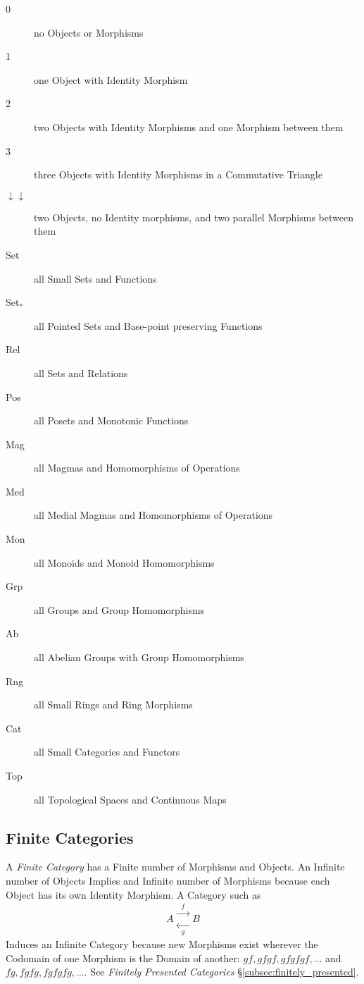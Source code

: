 \begin{description}
\item [0] no Objects or Morphisms
\item [1] one Object with Identity Morphism
\item [2] two Objects with Identity Morphisms and one Morphism between
  them
\item [3] three Objects with Identity Morphisms in a Commutative
  Triangle
\item [$\downarrow\downarrow$] two Objects, no Identity morphisms, and
  two parallel Morphisms between them
\item [Set] all Small Sets and Functions
\item [Set$_*$] all Pointed Sets and Base-point preserving Functions
\item [Rel] all Sets and Relations
\item [Pos] all Posets and Monotonic Functions
\item [Mag] all Magmas and Homomorphisms of Operations
\item [Med] all Medial Magmas and Homomorphisms of Operations
\item [Mon] all Monoids and Monoid Homomorphisms
\item [Grp] all Groups and Group Homomorphisms
\item [Ab] all Abelian Groups with Group Homomorphisms
\item [Rng] all Small Rings and Ring Morphisms
\item [Cat] all Small Categories and Functors
\item [Top] all Topological Spaces and Continuous Maps
\end{description}

\subsection{Finite Categories}\label{subsec:finite_categories}

A \emph{Finite Category} has a Finite number of Morphisms and
Objects. An Infinite number of Objects Implies and Infinite number of
Morphisms because each Object has its own Identity Morphism. A
Category such as
\[
    A
    \begin{matrix}
    \xrightarrow{\;\;f\;\;}\\
    \xleftarrow[\;\;g\;\;]{}
    \end{matrix}
    B
\]
Induces an Infinite Category because new Morphisms exist wherever the
Codomain of one Morphism is the Domain of another: $gf, gfgf, gfgfgf,
\ldots$ and $fg, fgfg, fgfgfg, \ldots$. See \emph{Finitely Presented
  Categories} \S\ref{subsec:finitely_presented}.

